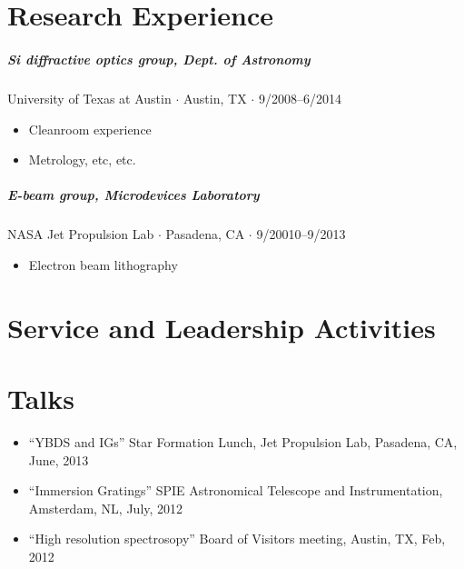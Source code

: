 \documentclass[10pt,letterpaper]{article}
\begin{document}
\section*{Research Experience}

\subparagraph{Si diffractive optics group, Dept. of Astronomy}
University of Texas at Austin $\cdot$ Austin, TX $\cdot$ 9/2008--6/2014
\begin{itemize}
    \item Cleanroom experience
    \item Metrology, etc, etc.
\end{itemize}

\subparagraph{E-beam group, Microdevices Laboratory}
NASA Jet Propulsion Lab $\cdot$ Pasadena, CA $\cdot$ 9/20010--9/2013
\begin{itemize}
    \item Electron beam lithography
\end{itemize}




\section*{Service and Leadership Activities}



\section*{Talks}

\begin{itemize}
    \item ``YBDS and IGs'' Star Formation Lunch, Jet Propulsion Lab, Pasadena, CA, June, 2013
    \item ``Immersion Gratings'' SPIE Astronomical Telescope and Instrumentation, Amsterdam, NL, July, 2012
    \item ``High resolution spectrosopy'' Board of Visitors meeting, Austin, TX, Feb, 2012

\end{itemize}
\end{document}
